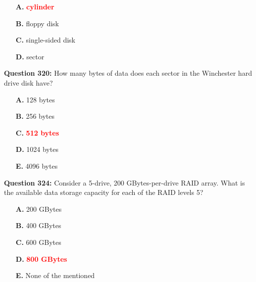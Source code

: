 \documentclass[12pt,a4paper]{article}
\begin{document}
\begin{itemize}
    \item[\textbf{A.}] \textcolor{red}{\textbf{cylinder}}
    \item[\textbf{B.}] floppy disk
    \item[\textbf{C.}] single-sided disk
    \item[\textbf{D.}] sector
\end{itemize}

\vspace{0.5cm}

\vspace{0.5cm}

\vspace{0.5cm}

\vspace{0.5cm}

\vspace{0.5cm}

\vspace{0.5cm}

\textbf{Question 320:} How many bytes of data does each sector in the Winchester hard drive disk have?

\begin{itemize}
    \item[\textbf{A.}] 128 bytes
    \item[\textbf{B.}] 256 bytes
    \item[\textbf{C.}] \textcolor{red}{\textbf{512 bytes}}
    \item[\textbf{D.}] 1024 bytes
    \item[\textbf{E.}] 4096 bytes
\end{itemize}

\vspace{0.5cm}

\vspace{0.5cm}

\vspace{0.5cm}

\vspace{0.5cm}

\textbf{Question 324:} Consider a 5-drive, 200 GBytes-per-drive RAID array. What is the available data storage capacity for each of the RAID levels 5?

\begin{itemize}
    \item[\textbf{A.}] 200 GBytes
    \item[\textbf{B.}] 400 GBytes
    \item[\textbf{C.}] 600 GBytes
    \item[\textbf{D.}] \textcolor{red}{\textbf{800 GBytes}}
    \item[\textbf{E.}] None of the mentioned
\end{itemize}
\end{document}
